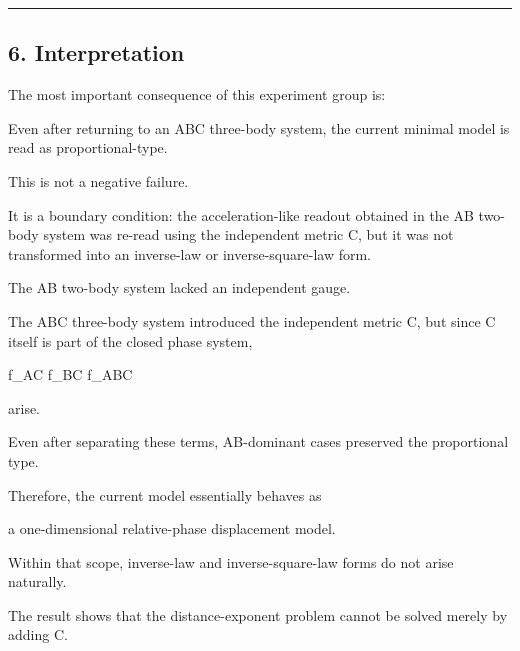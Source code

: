 \documentclass[
]{article}
\newenvironment{Shaded}{}{}
\newcommand{\NormalTok}[1]{#1}
\begin{document}
\begin{center}\rule{0.5\linewidth}{0.5pt}\end{center}

\subsection{6. Interpretation}\label{interpretation}

The most important consequence of this experiment group is:

\begin{Shaded}
\begin{Highlighting}[]
\NormalTok{Even after returning to an ABC three{-}body system, the current minimal model is read as proportional{-}type.}
\end{Highlighting}
\end{Shaded}

This is not a negative failure.

It is a boundary condition: the acceleration-like readout obtained in
the AB two-body system was re-read using the independent metric C, but
it was not transformed into an inverse-law or inverse-square-law form.

The AB two-body system lacked an independent gauge.

The ABC three-body system introduced the independent metric C, but since
C itself is part of the closed phase system,

\begin{Shaded}
\begin{Highlighting}[]
\NormalTok{f\_AC}
\NormalTok{f\_BC}
\NormalTok{f\_ABC}
\end{Highlighting}
\end{Shaded}

arise.

Even after separating these terms, AB-dominant cases preserved the
proportional type.

Therefore, the current model essentially behaves as

\begin{Shaded}
\begin{Highlighting}[]
\NormalTok{a one{-}dimensional relative{-}phase displacement model.}
\end{Highlighting}
\end{Shaded}

Within that scope, inverse-law and inverse-square-law forms do not arise
naturally.

The result shows that the distance-exponent problem cannot be solved
merely by adding C.
\end{document}
